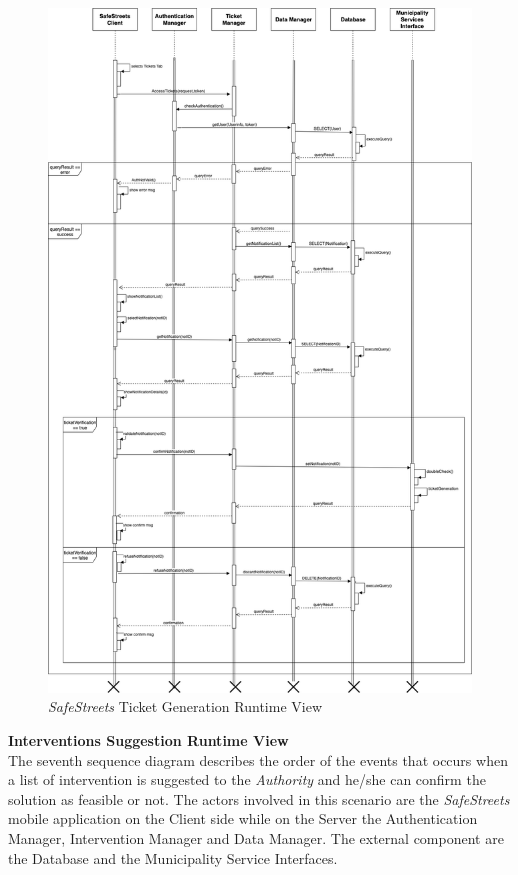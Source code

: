 \documentclass{article}
\begin{document}
	\begin{figure}[H]
			\centering
			\includegraphics[scale=0.19]{Images/Diagrams/Runtime/tickets_runtime.png}
			\caption{{\it SafeStreets} Ticket Generation Runtime View}
	\end{figure}
	\pagebreak
	\noindent	
	{\bf Interventions Suggestion Runtime View} \\
	The seventh sequence diagram describes the order of the events that occurs when a list of intervention is suggested to the {\it Authority} and he/she can confirm the solution as feasible or not. The actors involved in this scenario are the {\it SafeStreets} mobile application on the Client side while on the Server the Authentication Manager, Intervention Manager and Data Manager. The external component are the Database and the Municipality Service Interfaces. \\
\end{document}
